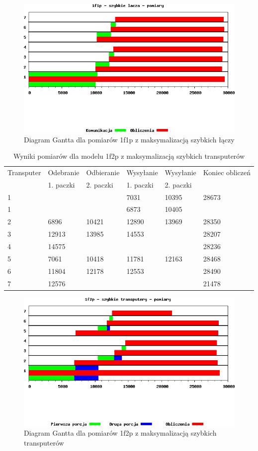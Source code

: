 \documentclass[a4paper,11pt, titlepage]{article}
\begin{document}
\begin{figure}[p!]
\includegraphics[width=1.0\textwidth]{wykresy/i1p1f_lacza}
\caption{Diagram Gantta dla pomiarów 1f1p z maksymalizacją szybkich łączy \label{i1p1f_lg}}
\end{figure}

\begin{table}[p!]
\begin{tabular}{|l|l|l|l|l|l|}\hline
Transputer&Odebranie&Odbieranie&Wysyłanie&Wysyłanie&Koniec obliczeń\\
&1. paczki&2. paczki&1. paczki&2. paczki&\\ \hline
1&&&7031&10395&28673\\ \hline
1&&&6873&10405&\\ \hline
2&6896&10421&12890&13969&28350\\ \hline
3&12913&13985&14553&&28207\\ \hline
4&14575&&&&28236\\ \hline
5&7061&10418&11781&12163&28468\\ \hline
6&11804&12178&12553&&28490\\ \hline
7&12576&&&&21478\\ \hline
\end{tabular}
\caption{Wyniki pomiarów dla modelu 1f2p z maksymalizacją szybkich transputerów \label{i2f1p_p}}
\end{table}
\begin{figure}[p!]
\includegraphics[width=1.0\textwidth]{wykresy/i2p1f_proc}
\caption{Diagram Gantta dla pomiarów 1f2p z maksymalizacją szybkich transputerów \label{i2p1f_pg}}
\end{figure}
\end{document}
